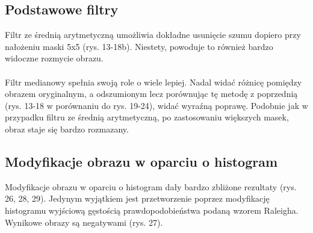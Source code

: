 \documentclass{classrep}
\begin{document}
\subsection{Podstawowe filtry}
Filtr ze średnią arytmetyczną umożliwia dokładne usunięcie szumu dopiero przy nałożeniu maski 5x5 (rys. 13-18b). Niestety, powoduje to również bardzo widoczne rozmycie obrazu.\\
\\
\indent
Filtr medianowy spełnia swoją role o wiele lepiej. Nadal widać różnicę pomiędzy obrazem oryginalnym, a odszumionym lecz porównując tę metodę z poprzednią (rys. 13-18 w porównaniu do rys. 19-24), widać wyraźną poprawę. Podobnie jak w przypadku filtru ze średnią arytmetyczną, po zastosowaniu większych masek, obraz staje się bardzo rozmazany.\\

\subsection{Modyfikacje obrazu w oparciu o histogram}
Modyfikacje obrazu w oparciu o histogram dały bardzo zbliżone rezultaty (rys. 26, 28, 29). Jedynym wyjątkiem jest przetworzenie poprzez modyfikację histogramu wyjściową gęstością prawdopodobieństwa podaną wzorem Raleigha. Wynikowe obrazy są negatywami (rys. 27).
\end{document}
